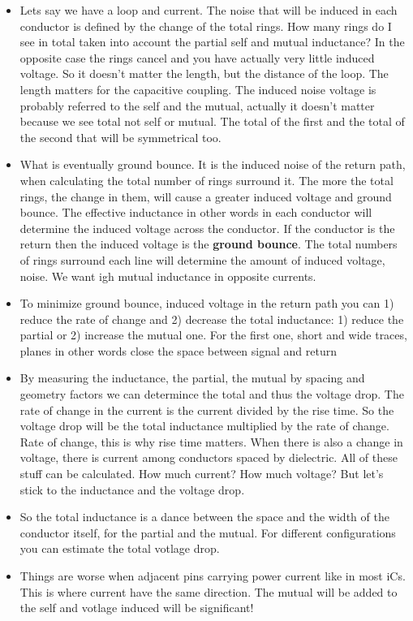 \documentclass[12pt]{article}
\begin{document}
\begin{itemize}
	\item Lets say we have a loop and current. The noise that will be induced in each conductor is defined by the change of the total rings. How many rings do I see in total taken into account the partial self and mutual inductance? In the opposite case the rings cancel and you have actually very little induced voltage. So it doesn't matter the length, but the distance of the loop. The length matters for the capacitive coupling. The induced noise voltage is probably referred to the self and the mutual, actually it doesn't matter because we see total not self or mutual. The total of the first and the total of the second that will be symmetrical too. 
	\item What is eventually ground bounce. It is the induced noise of the return path, when calculating the total number of rings surround it. The more the total rings, the change in them, will cause a greater induced voltage and ground bounce. The effective inductance in other words in each conductor will determine the induced voltage across the conductor. If the conductor is the return then the induced voltage is the \textbf{ground bounce}. The total numbers of rings surround each line will determine the amount of induced voltage, noise. We want igh mutual inductance in opposite currents.
	\item To minimize ground bounce, induced voltage in the return path you can 1) reduce the rate of change and 2) decrease the total inductance: 1) reduce the partial or 2) increase the mutual one. For the first one, short and wide traces, planes in other words close the space between signal and return
	\item By measuring the inductance, the partial, the mutual by spacing and geometry factors we can determince the total and thus the voltage drop. The rate of change in the current is the current divided by the rise time. So the voltage drop will be the total inductance multiplied by the rate of change. Rate of change, this is why rise time matters. When there is also a change in voltage, there is current among conductors spaced by dielectric. All of these stuff can be calculated. How much current? How much voltage? But let's stick to the inductance and the voltage drop.
	\item So the total inductance is a dance between the space and the width of the conductor itself, for the partial and the mutual. For different configurations you can estimate the total votlage drop.
	\item Things are worse when adjacent pins carrying power current like in most iCs. This is where current have the same direction. The mutual will be added to the self and votlage induced will be significant!
	

\end{itemize}
\end{document}
